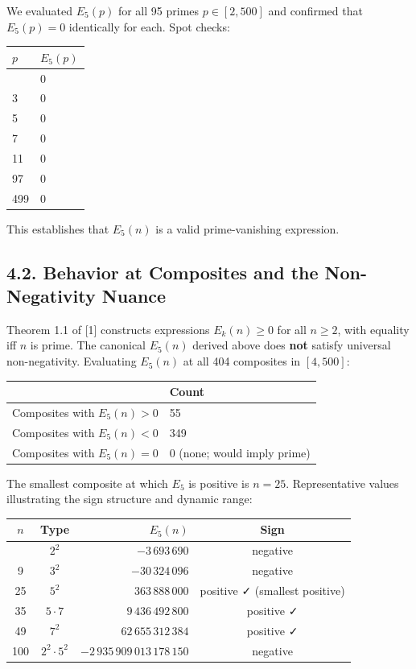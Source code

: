 \documentclass[
  11pt,
]{article}
\newcounter{none} %
\begin{document}
We evaluated \(E_5(p)\) for all 95 primes \(p \in [2, 500]\) and
confirmed that \(E_5(p) = 0\) identically for each. Spot checks:

{\def\LTcaptype{none} %
\begin{longtable}[]{@{}ll@{}}
\toprule\noalign{}
\(p\) & \(E_5(p)\) \\
\midrule\noalign{}
\endhead
\bottomrule\noalign{}
\endlastfoot
2 & 0 \\
3 & 0 \\
5 & 0 \\
7 & 0 \\
11 & 0 \\
97 & 0 \\
499 & 0 \\
\end{longtable}
}

This establishes that \(E_5(n)\) is a valid prime-vanishing expression.

\subsection{4.2. Behavior at Composites and the Non-Negativity
Nuance}\label{behavior-at-composites-and-the-non-negativity-nuance}

Theorem 1.1 of {[}1{]} constructs expressions \(E_k(n) \geq 0\) for all
\(n \geq 2\), with equality iff \(n\) is prime. The canonical \(E_5(n)\)
derived above does \textbf{not} satisfy universal non-negativity.
Evaluating \(E_5(n)\) at all 404 composites in \([4, 500]\):

{\def\LTcaptype{none} %
\begin{longtable}[]{@{}ll@{}}
\toprule\noalign{}
& Count \\
\midrule\noalign{}
\endhead
\bottomrule\noalign{}
\endlastfoot
Composites with \(E_5(n) > 0\) & 55 \\
Composites with \(E_5(n) < 0\) & 349 \\
Composites with \(E_5(n) = 0\) & 0 (none; would imply prime) \\
\end{longtable}
}

The smallest composite at which \(E_5\) is positive is \(n = 25\).
Representative values illustrating the sign structure and dynamic range:

{\def\LTcaptype{none} %
\begin{longtable}[]{@{}ccrc@{}}
\toprule\noalign{}
\(n\) & Type & \(E_5(n)\) & Sign \\
\midrule\noalign{}
\endhead
\bottomrule\noalign{}
\endlastfoot
4 & \(2^2\) & \(-3\,693\,690\) & negative \\
9 & \(3^2\) & \(-30\,324\,096\) & negative \\
25 & \(5^2\) & \(363\,888\,000\) & positive ✓ (smallest positive) \\
35 & \(5 \cdot 7\) & \(9\,436\,492\,800\) & positive ✓ \\
49 & \(7^2\) & \(62\,655\,312\,384\) & positive ✓ \\
100 & \(2^2 \cdot 5^2\) & \(-2\,935\,909\,013\,178\,150\) & negative \\
\end{longtable}
}
\end{document}
